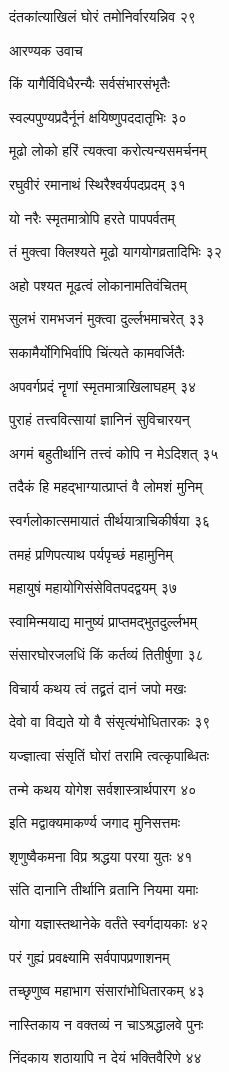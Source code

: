 दंतकांत्याखिलं घोरं तमोनिर्वारयन्निव २९

आरण्यक उवाच

किं यागैर्विविधैरन्यैः सर्वसंभारसंभृतैः

स्वल्पपुण्यप्रदैर्नूनं क्षयिष्णुपददातृभिः ३०

मूढो लोको हरिं त्यक्त्वा करोत्यन्यसमर्चनम्

रघुवीरं रमानाथं स्थिरैश्वर्यपदप्रदम् ३१

यो नरैः स्मृतमात्रोपि हरते पापपर्वतम्

तं मुक्त्वा क्लिश्यते मूढो यागयोगव्रतादिभिः ३२

अहो पश्यत मूढत्वं लोकानामतिवंचितम्

सुलभं रामभजनं मुक्त्वा दुर्ल्लभमाचरेत् ३३

सकामैर्योगिभिर्वापि चिंत्यते कामवर्जितैः

अपवर्गप्रदं नॄणां स्मृतमात्राखिलाघहम् ३४

पुराहं तत्त्ववित्सायां ज्ञानिनं सुविचारयन्

अगमं बहुतीर्थानि तत्त्वं कोपि न मेऽदिशत् ३५

तदैकं हि महद्भाग्यात्प्राप्तं वै लोमशं मुनिम्

स्वर्गलोकात्समायातं तीर्थयात्राचिकीर्षया ३६

तमहं प्रणिपत्याथ पर्यपृच्छं महामुनिम्

महायुषं महायोगिसंसेवितपदद्वयम् ३७

स्वामिन्मयाद्य मानुष्यं प्राप्तमद्भुतदुर्ल्लभम्

संसारघोरजलधिं किं कर्तव्यं तितीर्षुणा ३८

विचार्य कथय त्वं तद्व्रतं दानं जपो मखः

देवो वा विद्यते यो वै संसृत्यंभोधितारकः ३९

यज्ज्ञात्वा संसृतिं घोरां तरामि त्वत्कृपाब्धितः

तन्मे कथय योगेश सर्वशास्त्रार्थपारग ४०

इति मद्वाक्यमाकर्ण्य जगाद मुनिसत्तमः

शृणुष्वैकमना विप्र श्रद्धया परया युतः ४१

संति दानानि तीर्थानि व्रतानि नियमा यमाः

योगा यज्ञास्तथानेके वर्तंते स्वर्गदायकाः ४२

परं गुह्यं प्रवक्ष्यामि सर्वपापप्रणाशनम्

तच्छृणुष्व महाभाग संसारांभोधितारकम् ४३

नास्तिकाय न वक्तव्यं न चाऽश्रद्धालवे पुनः

निंदकाय शठायापि न देयं भक्तिवैरिणे ४४

